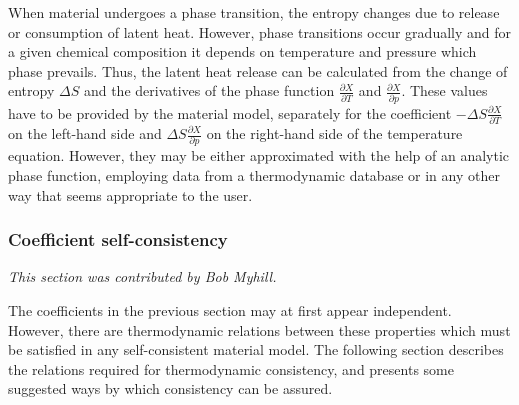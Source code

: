 \documentclass{article}
\begin{document}
\begin{itemize}
  When material undergoes a phase transition, the entropy changes due to
  release or consumption of latent heat. However, phase transitions occur
  gradually and for a given chemical composition it depends on temperature
  and pressure which phase prevails. Thus, the latent heat release can
  be calculated from the change of entropy $\Delta S$ and the derivatives
  of the phase function $\frac{\partial X}{\partial T}$ and
  $\frac{\partial X}{\partial p}$. These values have to be provided by
  the material model, separately for the coefficient
  $-\Delta S \frac{\partial X}{\partial T}$ on the left-hand side and
  $\Delta S \frac{\partial X}{\partial p}$ on the right-hand side of the
  temperature equation. However, they may be either approximated with the help
  of an analytic phase function, employing data from a thermodynamic database
  or in any other way that seems appropriate to the user.
\end{itemize}

\subsubsection{Coefficient self-consistency}
\label{sec:coefficient_self_consistency}
\textit{This section was contributed by Bob Myhill.}

The coefficients in the previous section may at first appear independent.
However, there are thermodynamic relations between these properties which must be
satisfied in any self-consistent material model.
The following section describes the relations required for thermodynamic
consistency, and presents some suggested ways by which consistency can be assured.
\end{document}
